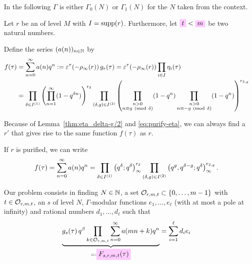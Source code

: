 \documentclass{article}
\begin{document}
In the following $\Gamma$ is either $\Gamma_0(N)$ or $\Gamma_1(N)$ for
the $N$ taken from the context.

Let $r$ be an  of level $M$ with
$I=\operatorname{supp}(r)$.
%
Furthermore, let $\defineNotation{t} < \defineNotation{m}$ be two
natural numbers.

Define the series $(a(n))_{n\in\mathbb{N}}$ by
\begin{align}
  f(\tau)
  &=
    \sum_{n=0}^\infty a(n)q^n
    :=
    \varepsilon^\tau\!\left(-\rho_\infty(r)\right) g_r(\tau)
    =
    \varepsilon^\tau\!\left(-\rho_\infty(r)\right) \prod_{i\in I} \eta_i(\tau)
  \notag
  \\
  &= \prod_{\delta\in I^{(1)}}
    \left(\prod_{n=1}^{\infty}(1-q^{\delta n})\right)^{r_\delta}
    \prod_{(\delta,g)\in I^{(2)}}
    \left(
    \prod_{\substack{n>0\\n\equiv g\ (\mathrm{mod}\ \delta)}} (1-q^n)
    \prod_{\substack{n>0\\n\equiv -g\ (\mathrm{mod}\ \delta)}} (1-q^n)
    \right)^{r_{\delta,g}}
  \label{eq:f(tau)}
\end{align}

Because of Lemma~\ref{thm:eta_delta-g/2} and \eqref{eq:purify-eta}, we
can always find a  $r'$ that gives
rise to the same function $f(\tau)$ as $r$.

If $r$ is purified, we can write
\begin{gather}
  f(\tau)
  =
    \sum_{n=0}^\infty a(n)q^n
  =
  \prod_{\delta\in I^{(1)}} \left( q^\delta;q^\delta \right)_{\infty}^{r_\delta}
  \prod_{(\delta,g)\in I^{(2)}}
    \left( q^g, q^{\delta-g};q^\delta \right)_{\infty}^{r_{\delta,g}}.
\end{gather}


Our problem consists in finding $N\in\mathbb{N}$, a set
$\mathcal{O}_{r,m,t} \subset \left\{0,\ldots,m-1\right\}$ with
$t\in\mathcal{O}_{r,m,t}$, an 
$s$ of level $N$, $\Gamma$-modular functions
$e_1,\ldots,e_\ell$ (with at most a pole at infinity) and rational
numbers $d_1,\ldots,d_\ell$ such that
\begin{gather}
  \underbrace{
    g_s(\tau)\,
    q^\beta
    \prod_{k\in\modularOrbit{r,m,t}} \sum_{n=0}^\infty a(mn+k) q^n
    }_{=:\defineNotation[F-s,r,m,t-tau]{F_{s,r,m,t}(\tau)}}
  =
  \sum_{i=1}^\ell d_i e_i
  \label{eq:Ramanujan-Kolberg-Identity}
\end{gather}
\end{document}
